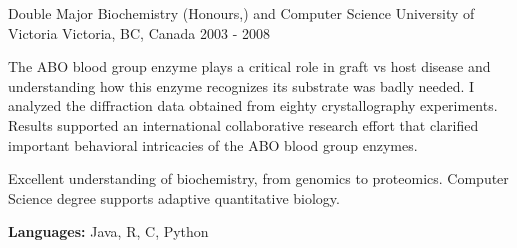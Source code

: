 \begin{cventries}
\cventry
{Double Major Biochemistry (Honours,) and Computer Science} %
{University of Victoria} %
{Victoria, BC, Canada} %
{2003 - 2008} %
{
\begin{cvitems}
 \item {The ABO blood group enzyme plays a critical role in graft vs host disease and understanding how this enzyme recognizes its substrate was badly needed. I analyzed the diffraction data obtained     from eighty crystallography experiments. Results supported an international collaborative research effort that clarified important behavioral intricacies of the ABO blood group enzymes.}
 \item {Excellent understanding of biochemistry, from  genomics to proteomics. Computer Science degree supports adaptive quantitative biology.}
 \item {\textbf{Languages:} Java, R, C, Python}
\end{cvitems}
}
\end{cventries}
